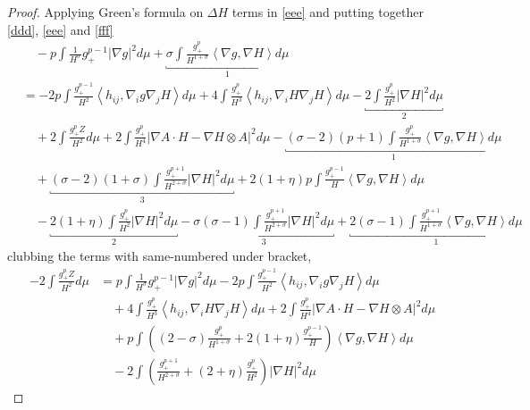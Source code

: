 \begin{proof}
    Applying Green's formula on $ \Delta H $ terms in \cref{eee} and putting together \cref{ddd}, \cref{eee} and \cref{fff} 
    \begin{align*}
        & \quad -p \int \frac{1}{H^{\sigma}}g_{+}^{p-1}|\nabla g|^{2}d \mu+ \underbracket{\sigma \int \frac{g_{+}^{p}}{H^{1+\sigma}}\left<  \nabla g,\nabla H \right>d \mu}_{1} \\
        & = -2p \int \frac{g_{+}^{p-1}}{H^{2}} \left< h_{ij}, \nabla_{i}g \nabla_{j}H \right>d \mu + 4 \int \frac{g_{+}^{p}}{H^{3}} \left<  h_{ij}, \nabla_{i}H\nabla_{j}H  \right>d \mu -\underbracket{2 \int \frac{g_{+}^{p}}{H^{2}}|\nabla H|^{2}d \mu}_{2}  \\
        & \quad + 2 \int \frac{g_{+}^{p}Z}{H^{2}}d \mu + 2 \int \frac{g_{+}^{p}}{H^{4}}| \nabla A \cdot H - \nabla H \otimes A|^{2}d \mu - \underbracket{(\sigma -2 )(p+1)\int \frac{g_{+}^{p}}{H^{1+\sigma}} \left< \nabla g, \nabla H \right> d \mu}_{1} \\
        & \quad + \underbracket{(\sigma-2)(1+\sigma) \int \frac{g_{+}^{p+1}}{H^{2+\sigma}}|\nabla H|^{2} d \mu}_{3}  + 2(1+\eta)p \int \frac{g_{+}^{p-1}}{H}\left< \nabla g , \nabla H\right>d \mu \\
        & \quad -\underbracket{2(1+\eta) \int \frac{g_{+}^{p}}{H^{2}}| \nabla H|^{2} d \mu}_{2} - \underbracket{\sigma(\sigma-1)\int \frac{g_{+}^{p+1}}{H^{2+\sigma}}|\nabla H|^{2}d \mu}_{3} + \underbracket{2(\sigma -1) \int \frac{g_{+}^{p+1}}{H^{1+\sigma}}\left< \nabla g, \nabla H \right>d \mu}_{1}
    \end{align*}
    clubbing the terms with same-numbered under bracket,  \begin{align}
        -2 \int \frac{g_{+}^{p}Z}{H^{2}}d \mu & = p \int \frac{1}{H^{\sigma}}g_{+}^{p-1}|\nabla g|^{2}d \mu-2p \int \frac{g_{+}^{p-1}}{H^{2}} \left< h_{ij}, \nabla_{i}g \nabla_{j}H \right>d \mu \nonumber\\
        & \quad + 4 \int \frac{g_{+}^{p}}{H^{3}} \left<  h_{ij}, \nabla_{i}H\nabla_{j}H  \right>d \mu + 2 \int \frac{g_{+}^{p}}{H^{4}}| \nabla A \cdot H - \nabla H \otimes A|^{2}d \mu \nonumber \\
        & \quad + p \int \left( (2-\sigma) \frac{g_{+}^{p}}{H^{1+\sigma}}+ 2(1+\eta) \frac{g_{+}^{p-1}}{H} \right)\left< \nabla g, \nabla H \right>d \mu \nonumber \\
        & \quad -2 \int \left( \frac{g_{+}^{p+1}}{H^{2+\sigma}}+ (2+\eta) \frac{g_{+}^{p}}{H^{2}} \right) | \nabla H|^{2}d \mu \label{ggg}
    \end{align}


\end{proof}
